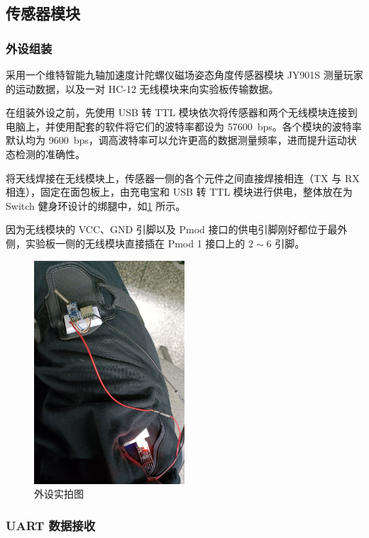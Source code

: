 \documentclass[UTF8, 11pt, fontset=none]{ctexart}
\begin{document}
\subsection{传感器模块}

\subsubsection{外设组装}

采用一个维特智能九轴加速度计陀螺仪磁场姿态角度传感器模块 JY901S 测量玩家的运动数据，以及一对 HC-12 无线模块来向实验板传输数据。

在组装外设之前，先使用 USB 转 TTL 模块依次将传感器和两个无线模块连接到电脑上，并使用配套的软件将它们的波特率都设为 \SI{57600}{bps}。各个模块的波特率默认均为 \SI{9600}{bps}，调高波特率可以允许更高的数据测量频率，进而提升运动状态检测的准确性。

将天线焊接在无线模块上，传感器一侧的各个元件之间直接焊接相连（TX 与 RX 相连），固定在面包板上，由充电宝和 USB 转 TTL 模块进行供电，整体放在为 Switch 健身环设计的绑腿中，如\cref{sensor} 所示。

因为无线模块的 VCC、GND 引脚以及 Pmod 接口的供电引脚刚好都位于最外侧，实验板一侧的无线模块直接插在 Pmod 1 接口上的 $2 \sim 6$ 引脚。

\begin{figure}[H]
    \centering
    \includegraphics[width=0.5\textwidth]{images/sensor.jpg}
    \caption{外设实拍图}
    \label{sensor}
\end{figure}

\subsubsection{UART 数据接收}
\end{document}
